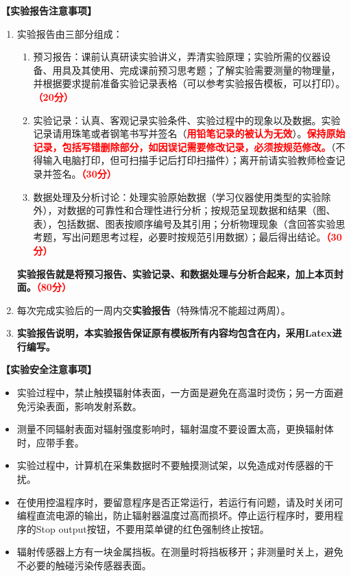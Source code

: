 \documentclass[dvipsnames, svgnames,a4paper,11pt]{article}
\begin{document}
	\textbf{【实验报告注意事项】}
	\begin{enumerate}
		\item 实验报告由三部分组成：
		\begin{enumerate}
			\item 预习报告：课前认真研读实验讲义，弄清实验原理；实验所需的仪器设备、用具及其使用、完成课前预习思考题；了解实验需要测量的物理量，并根据要求提前准备实验记录表格（可以参考实验报告模板，可以打印）。\textcolor{red}{\textbf{（20分）}}
			\item 实验记录：认真、客观记录实验条件、实验过程中的现象以及数据。实验记录请用珠笔或者钢笔书写并签名（\textcolor{red}{\textbf{用铅笔记录的被认为无效}}）。\textcolor{red}{\textbf{保持原始记录，包括写错删除部分，如因误记需要修改记录，必须按规范修改。}}（不得输入电脑打印，但可扫描手记后打印扫描件）；离开前请实验教师检查记录并签名。\textcolor{red}{\textbf{（30分）}}
			\item 数据处理及分析讨论：处理实验原始数据（学习仪器使用类型的实验除外），对数据的可靠性和合理性进行分析；按规范呈现数据和结果（图、表），包括数据、图表按顺序编号及其引用；分析物理现象（含回答实验思考题，写出问题思考过程，必要时按规范引用数据）；最后得出结论。\textcolor{red}{\textbf{（30分）}}
		\end{enumerate}
		\textbf{实验报告就是将预习报告、实验记录、和数据处理与分析合起来，加上本页封面。\textcolor{red}{（80分）}}
		\item 每次完成实验后的一周内交\textbf{实验报告}（特殊情况不能超过两周）。
		\item \textbf{实验报告说明，本实验报告保证原有模板所有内容均包含在内，采用Latex进行编写。}
	
	\end{enumerate}
	
	\textbf{【实验安全注意事项】}	
	\begin{itemize}
		\item 实验过程中，禁止触摸辐射体表面，一方面是避免在高温时烫伤；另一方面避免污染表面，影响发射系数。
		\item 测量不同辐射表面对辐射强度影响时，辐射温度不要设置太高，更换辐射体时，应带手套。
		\item 实验过程中，计算机在采集数据时不要触摸测试架，以免造成对传感器的干扰。
		\item 在使用控温程序时，要留意程序是否正常运行，若运行有问题，请及时关闭可编程直流电源的输出，防止辐射器温度过高而损坏。停止运行程序时，要用程序的Stop output按钮，不要用菜单键的红色强制终止按钮。
		\item 辐射传感器上方有一块金属挡板。在测量时将挡板移开；非测量时关上，避免不必要的触碰污染传感器表面。
	  \end{itemize}
	
\end{document}

